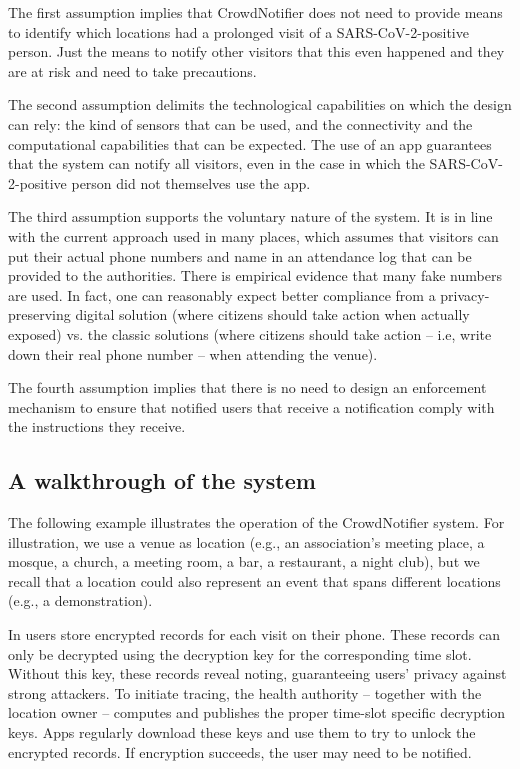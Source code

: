 The first assumption implies that CrowdNotifier does not need to provide means to identify which locations had a prolonged visit of a SARS-CoV-2-positive person. Just the means to notify other visitors that this even happened and they are at risk and need to take precautions.

The second assumption delimits the technological capabilities on which the design can rely: the kind of sensors that can be used, and the connectivity and the computational capabilities that can be expected.
The use of an app guarantees that the system can notify all visitors, even in the case in which the SARS-CoV-2-positive person did not themselves use the app. 

The third assumption supports the voluntary nature of the system. It is in line with the current approach used in many places, which assumes that visitors can put their actual phone numbers and name in an attendance log that can be provided to the authorities. There is empirical evidence that many fake numbers are used. In fact, one can reasonably expect better compliance from a privacy-preserving digital solution (where citizens should take action when actually exposed) vs. the classic solutions (where citizens should take action -- i.e, write down their real phone number -- when attending the venue).

The fourth assumption implies that there is no need to design an enforcement mechanism to ensure that notified users that receive a notification comply with the instructions they receive.

\subsection{A walkthrough of the system}
The following example illustrates the operation of the CrowdNotifier system. For illustration, we use a venue as location (e.g., an association’s meeting place, a mosque, a church, a meeting room, a bar, a restaurant, a night club), but we recall that a location could also represent an event that spans different locations (e.g., a demonstration). 

In \name users store encrypted records for each visit on their phone. These
records can only be decrypted using the decryption key for the corresponding
time slot. Without this key, these records reveal noting, guaranteeing users'
privacy against strong attackers. To initiate tracing, the health authority -- together with the location owner -- computes and publishes the proper time-slot specific decryption keys. Apps regularly download these keys and use them to try to unlock the encrypted records. If encryption succeeds, the user may need to be notified.

